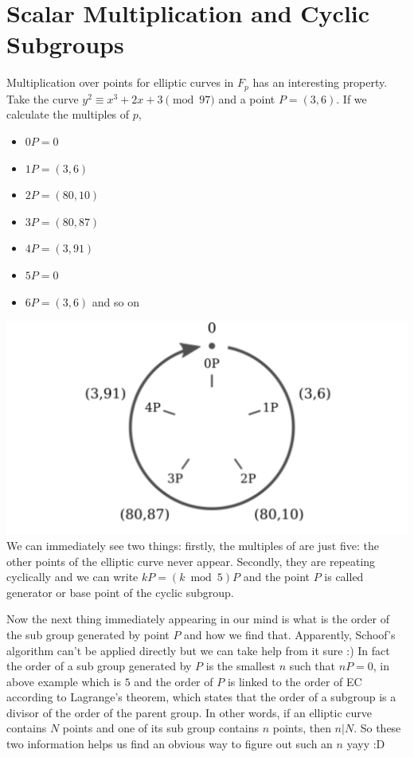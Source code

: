 \documentclass[12pt,letterpaper]{article}
\begin{document}
\section{Scalar Multiplication and Cyclic Subgroups}
Multiplication over points for elliptic curves in $F_p$ has an interesting property. Take the curve $y^2 \equiv x^3 + 2x + 3 \pmod{97}$ and a point $P=(3,6)$. If we calculate the multiples of $p$, 
\begin{itemize}
    \item $0P=0$
    \item $1P=(3,6)$
    \item $2P=(80,10)$
    \item $3P=(80,87)$
    \item $4P=(3,91)$
    \item $5P=0$
    \item $6P=(3,6)$ and so on
\end{itemize}
    \includegraphics[scale=0.8]{add2.PNG}\\
We can immediately see two things: firstly, the multiples of  are just five: the other points of the elliptic curve never appear. Secondly, they are repeating cyclically and we can write $kP = (k \bmod{5})P$ and the point $P$ is called generator or base point of the cyclic subgroup.

Now the next thing immediately appearing in our mind is what is the order of the sub group generated by point $P$ and how we find that. Apparently, Schoof's algorithm can't be applied directly but we can take help from it sure :) In fact the order of a sub group generated by $P$ is the smallest $n$ such that $nP=0$, in above example which is $5$ and the order of $P$ is linked to the order of EC according to Lagrange's theorem, which states that the order of a subgroup is a divisor of the order of the parent group. In other words, if an elliptic curve contains $N$ points and one of its sub group contains $n$ points, then $n|N$. So these two information helps us find an obvious way to figure out such an $n$ yayy :D 
\end{document}

